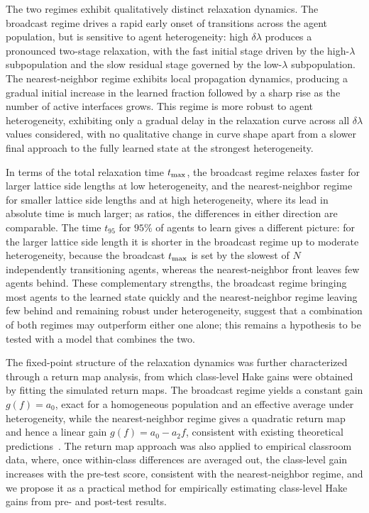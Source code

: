 \documentclass[a4paper,fleqn]{cas-sc}
\begin{document}
The two regimes exhibit qualitatively distinct relaxation dynamics.
The broadcast regime drives a rapid early onset of transitions across the agent population, but is sensitive to agent heterogeneity: high $\delta\lambda$ produces a pronounced two-stage relaxation, with the fast initial stage driven by the high-$\lambda$ subpopulation and the slow residual stage governed by the low-$\lambda$ subpopulation.
The nearest-neighbor regime exhibits local propagation dynamics, producing a gradual initial increase in the learned fraction followed by a sharp rise as the number of active interfaces grows.
This regime is more robust to agent heterogeneity, exhibiting only a gradual delay in the relaxation curve across all $\delta\lambda$ values considered, with no qualitative change in curve shape apart from a slower final approach to the fully learned state at the strongest heterogeneity.

In terms of the total relaxation time $t_{\rm max}$, the broadcast regime relaxes faster for larger lattice side lengths at low heterogeneity, and the nearest-neighbor regime for smaller lattice side lengths and at high heterogeneity, where its lead in absolute time is much larger; as ratios, the differences in either direction are comparable.
The time $t_{95}$ for $95\%$ of agents to learn gives a different picture: for the larger lattice side length it is shorter in the broadcast regime up to moderate heterogeneity, because the broadcast $t_{\rm max}$ is set by the slowest of $N$ independently transitioning agents, whereas the nearest-neighbor front leaves few agents behind.
These complementary strengths, the broadcast regime bringing most agents to the learned state quickly and the nearest-neighbor regime leaving few behind and remaining robust under heterogeneity, suggest that a combination of both regimes may outperform either one alone; this remains a hypothesis to be tested with a model that combines the two.

The fixed-point structure of the relaxation dynamics was further characterized through a return map analysis, from which class-level Hake gains were obtained by fitting the simulated return maps.
The broadcast regime yields a constant gain $g(f)=a_0$, exact for a homogeneous population and an effective average under heterogeneity, while the nearest-neighbor regime gives a quadratic return map and hence a linear gain $g(f)=a_0-a_2f$, consistent with existing theoretical predictions~\citep{nitta2019mathematical}.
The return map approach was also applied to empirical classroom data, where, once within-class differences are averaged out, the class-level gain increases with the pre-test score, consistent with the nearest-neighbor regime, and we propose it as a practical method for empirically estimating class-level Hake gains from pre- and post-test results.
\end{document}
